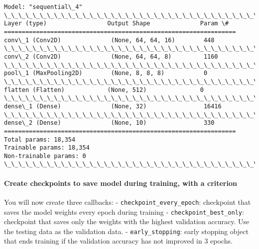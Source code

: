 \documentclass[11pt]{article}
\begin{document}
    \begin{Verbatim}[commandchars=\\\{\}]
Model: "sequential\_4"
\_\_\_\_\_\_\_\_\_\_\_\_\_\_\_\_\_\_\_\_\_\_\_\_\_\_\_\_\_\_\_\_\_\_\_\_\_\_\_\_\_\_\_\_\_\_\_\_\_\_\_\_\_\_\_\_\_\_\_\_\_\_\_\_\_
Layer (type)                 Output Shape              Param \#   
=================================================================
conv\_1 (Conv2D)              (None, 64, 64, 16)        448       
\_\_\_\_\_\_\_\_\_\_\_\_\_\_\_\_\_\_\_\_\_\_\_\_\_\_\_\_\_\_\_\_\_\_\_\_\_\_\_\_\_\_\_\_\_\_\_\_\_\_\_\_\_\_\_\_\_\_\_\_\_\_\_\_\_
conv\_2 (Conv2D)              (None, 64, 64, 8)         1160      
\_\_\_\_\_\_\_\_\_\_\_\_\_\_\_\_\_\_\_\_\_\_\_\_\_\_\_\_\_\_\_\_\_\_\_\_\_\_\_\_\_\_\_\_\_\_\_\_\_\_\_\_\_\_\_\_\_\_\_\_\_\_\_\_\_
pool\_1 (MaxPooling2D)        (None, 8, 8, 8)           0         
\_\_\_\_\_\_\_\_\_\_\_\_\_\_\_\_\_\_\_\_\_\_\_\_\_\_\_\_\_\_\_\_\_\_\_\_\_\_\_\_\_\_\_\_\_\_\_\_\_\_\_\_\_\_\_\_\_\_\_\_\_\_\_\_\_
flatten (Flatten)            (None, 512)               0         
\_\_\_\_\_\_\_\_\_\_\_\_\_\_\_\_\_\_\_\_\_\_\_\_\_\_\_\_\_\_\_\_\_\_\_\_\_\_\_\_\_\_\_\_\_\_\_\_\_\_\_\_\_\_\_\_\_\_\_\_\_\_\_\_\_
dense\_1 (Dense)              (None, 32)                16416     
\_\_\_\_\_\_\_\_\_\_\_\_\_\_\_\_\_\_\_\_\_\_\_\_\_\_\_\_\_\_\_\_\_\_\_\_\_\_\_\_\_\_\_\_\_\_\_\_\_\_\_\_\_\_\_\_\_\_\_\_\_\_\_\_\_
dense\_2 (Dense)              (None, 10)                330       
=================================================================
Total params: 18,354
Trainable params: 18,354
Non-trainable params: 0
\_\_\_\_\_\_\_\_\_\_\_\_\_\_\_\_\_\_\_\_\_\_\_\_\_\_\_\_\_\_\_\_\_\_\_\_\_\_\_\_\_\_\_\_\_\_\_\_\_\_\_\_\_\_\_\_\_\_\_\_\_\_\_\_\_

    \end{Verbatim}

    \hypertarget{create-checkpoints-to-save-model-during-training-with-a-criterion}{%
\paragraph{Create checkpoints to save model during training, with a
criterion}\label{create-checkpoints-to-save-model-during-training-with-a-criterion}}

You will now create three callbacks: -
\texttt{checkpoint\_every\_epoch}: checkpoint that saves the model
weights every epoch during training - \texttt{checkpoint\_best\_only}:
checkpoint that saves only the weights with the highest validation
accuracy. Use the testing data as the validation data. -
\texttt{early\_stopping}: early stopping object that ends training if
the validation accuracy has not improved in 3 epochs.
\end{document}
